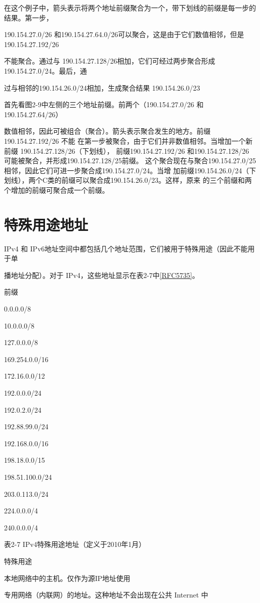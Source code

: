 在这个例子中，箭头表示将两个地址前缀聚合为一个，带下划线的前缀是每一步的结果。第一步，

190.154.27.0/26 和190.154.27.64.0/26可以聚合，这是由于它们数值相邻，但是190.154.27.192/26

不能聚合。通过与 190.154.27.128/26相加，它们可经过两步聚合形成 190.154.27.0/24。最后，通

过与相邻的190.154.26.0/24相加，生成聚合结果 190.154.26.0/23

首先看图2-9中左侧的三个地址前缀。前两个（190.154.27.0/26 和 190.154.27.64/26）

数值相邻，因此可被组合（聚合）。箭头表示聚合发生的地方。前缀190.154.27.192/26 不能
在第一步被聚合，由于它们并非数值相邻。当增加一个新前缀 190.154.27.128/26（下划线），
前缀190.154.27.192/26 和190.154.27.128/26 可能被聚合，并形成190.154.27.128/25前缀。
这个聚合现在与聚合190.154.27.0/25相邻，因此它们可进一步聚合成190.154.27.0/24。当增
加前缀190.154.26.0/24（下划线），两个C类的前缀可以聚合成190.154.26.0/23。这样，原来
的三个前缀和两个增加的前缀可聚合成一个前缀。

\section{特殊用途地址}
IPv4 和 IPv6地址空间中都包括几个地址范围，它们被用于特殊用途（因此不能用于单

播地址分配）。对于 IPv4，这些地址显示在表2-7中\href{https://www.rfc-editor.org/rfc/rfc5735}{[RFC5735]}。

前缀

0.0.0.0/8

10.0.0.0/8

127.0.0.0/8

169.254.0.0/16

172.16.0.0/12

192.0.0.0/24

192.0.2.0/24

192.88.99.0/24

192.168.0.0/16

198.18.0.0/15

198.51.100.0/24

203.0.113.0/24

224.0.0.0/4

240.0.0.0/4

表2-7 IPv4特殊用途地址（定义于2010年1月）

特殊用途

本地网络中的主机。仅作为源IP地址使用

专用网络（内联网）的地址。这种地址不会出现在公共 Internet 中

